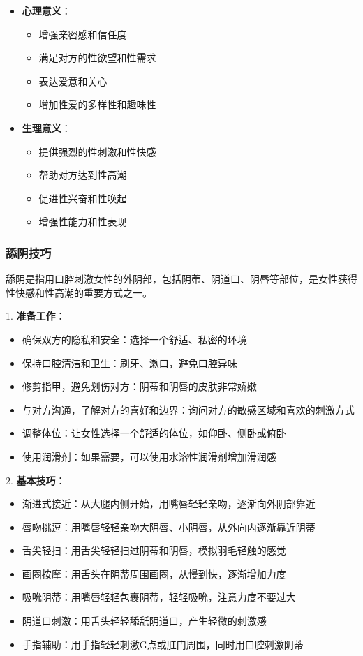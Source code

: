 \documentclass[12pt,UTF8]{ctexbook}
\begin{document}
\begin{itemize}
\item \textbf{心理意义}：
  \begin{itemize}
  \item 增强亲密感和信任度
  \item 满足对方的性欲望和性需求
  \item 表达爱意和关心
  \item 增加性爱的多样性和趣味性
  \end{itemize}
\item \textbf{生理意义}：
  \begin{itemize}
  \item 提供强烈的性刺激和性快感
  \item 帮助对方达到性高潮
  \item 促进性兴奋和性唤起
  \item 增强性能力和性表现
  \end{itemize}
\end{itemize}

\subsubsection{舔阴技巧}

舔阴是指用口腔刺激女性的外阴部，包括阴蒂、阴道口、阴唇等部位，是女性获得性快感和性高潮的重要方式之一。

1. \textbf{准备工作}：
  \begin{itemize}
  \item 确保双方的隐私和安全：选择一个舒适、私密的环境
  \item 保持口腔清洁和卫生：刷牙、漱口，避免口腔异味
  \item 修剪指甲，避免划伤对方：阴蒂和阴唇的皮肤非常娇嫩
  \item 与对方沟通，了解对方的喜好和边界：询问对方的敏感区域和喜欢的刺激方式
  \item 调整体位：让女性选择一个舒适的体位，如仰卧、侧卧或俯卧
  \item 使用润滑剂：如果需要，可以使用水溶性润滑剂增加滑润感
  \end{itemize}

2. \textbf{基本技巧}：
  \begin{itemize}
  \item 渐进式接近：从大腿内侧开始，用嘴唇轻轻亲吻，逐渐向外阴部靠近
  \item 唇吻挑逗：用嘴唇轻轻亲吻大阴唇、小阴唇，从外向内逐渐靠近阴蒂
  \item 舌尖轻扫：用舌尖轻轻扫过阴蒂和阴唇，模拟羽毛轻触的感觉
  \item 画圈按摩：用舌头在阴蒂周围画圈，从慢到快，逐渐增加力度
  \item 吸吮阴蒂：用嘴唇轻轻包裹阴蒂，轻轻吸吮，注意力度不要过大
  \item 阴道口刺激：用舌头轻轻舔舐阴道口，产生轻微的刺激感
  \item 手指辅助：用手指轻轻刺激G点或肛门周围，同时用口腔刺激阴蒂
  \end{itemize}
\end{document}
